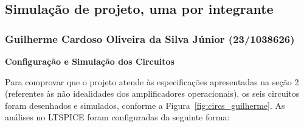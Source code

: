 \documentclass[11pt,a4paper]{article}
\begin{document}
\subsection{Simulação de projeto, uma por integrante}

\subsubsection{Guilherme Cardoso Oliveira da Silva Júnior (23/1038626)}

\textbf{Configuração e Simulação dos Circuitos}

Para comprovar que o projeto atende às especificações apresentadas na seção 2 (referentes às não idealidades dos amplificadores operacionais), os seis circuitos foram desenhados e simulados, conforme a Figura~\ref{fig:circs_guilherme}. As análises no LTSPICE foram configuradas da seguinte forma:
\end{document}
